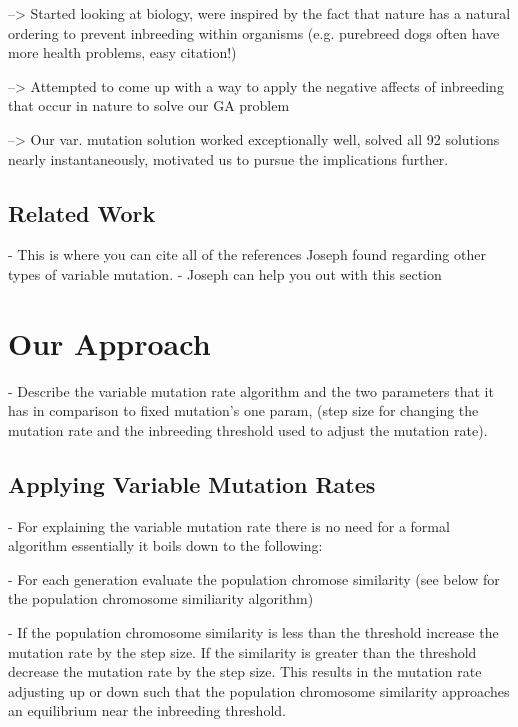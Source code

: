 \documentclass{sig-alternate}
\begin{document}
    --> Started looking at biology, were inspired by the fact that nature has
        a natural ordering to prevent inbreeding within organisms (e.g. purebreed
        dogs often have more health problems, easy citation!)
        
    --> Attempted to come up with a way to apply the negative affects of inbreeding 
        that occur in nature to solve our GA problem
        
    --> Our var. mutation solution worked exceptionally well, solved all 92
        solutions nearly instantaneously, motivated us to pursue the implications
        further.


\subsection{Related Work}

- This is where you can cite all of the references Joseph found regarding other types of variable mutation.
- Joseph can help you out with this section




% 
%
\section{Our Approach}

- Describe the variable mutation rate algorithm and the two parameters that it
  has in comparison to fixed mutation's one param, (step size for changing the
  mutation rate and the inbreeding threshold used to adjust the mutation rate).


\subsection{Applying Variable Mutation Rates}

- For explaining the variable mutation rate there is no need for a formal algorithm
  essentially it boils down to the following:

  - For each generation evaluate the population chromose similarity (see below
    for the population chromosome similiarity algorithm)

  - If the population chromosome similarity is less than the threshold increase
    the mutation rate by the step size. If the similarity is greater than the
    threshold decrease the mutation rate by the step size. This results in
    the mutation rate adjusting up or down such that the population chromosome
    similarity approaches an equilibrium near the inbreeding threshold.
\end{document}
